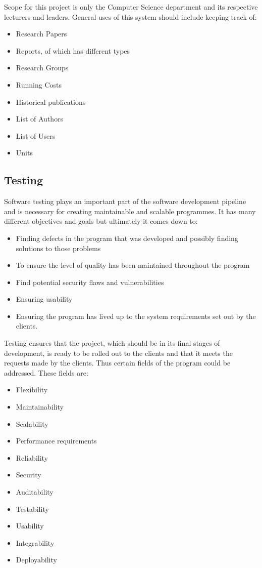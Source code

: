 \documentclass{article}
\begin{document}
    Scope for this project is only the Computer Science department and its respective lecturers and leaders.
    General uses of this system should include keeping track of:
    \begin{itemize}
        \item Research Papers
        \item Reports, of which has different types
        \item Research Groups
        \item Running Costs
        \item Historical publications
        \item List of Authors
        \item List of Users
        \item Units 
    
    \end{itemize}
    \subsection{Testing}
        Software testing plays an important part of the software development pipeline and is necessary for creating maintainable and scalable programmes. It has many different objectives and goals but ultimately it comes down to:
        \begin{itemize}
            \item Finding defects in the program that was developed and possibly finding solutions to those problems
            \item To ensure the level of quality has been maintained throughout the program
            \item Find potential security flaws and vulnerabilities
            \item Ensuring usability
            \item Ensuring the program has lived up to the system requirements set out by the clients.
        \end{itemize}
    Testing ensures that the project, which should be in its final stages of development, is ready to be rolled out to the clients and that it meets the requests made by the clients. Thus certain fields of the program could be addressed. These fields are:
        \begin{itemize}
            \item Flexibility
            \item Maintainability
            \item Scalability
            \item Performance requirements
            \item Reliability
            \item Security
            \item Auditability
            \item Testability
            \item Usability
            \item Integrability
            \item Deployability
        \end{itemize}
\end{document}
